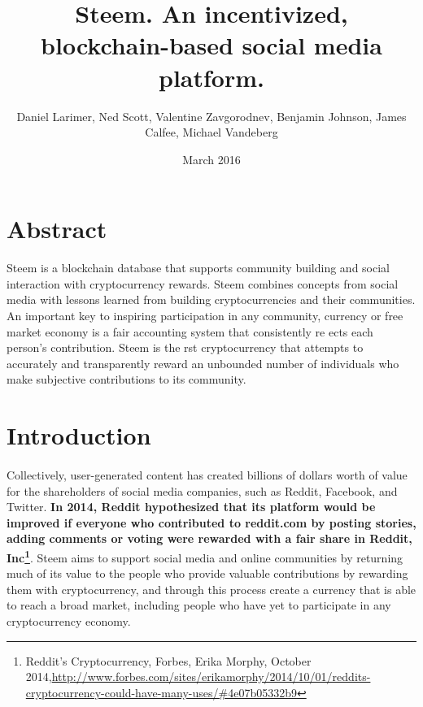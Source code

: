 \documentclass{article}
\title{Steem. An incentivized, blockchain-based social media platform.}
\date{March 2016}
\author{Daniel Larimer, Ned Scott, Valentine Zavgorodnev, Benjamin Johnson, James Calfee, Michael Vandeberg}
\begin{document}
  \renewcommand \thesection{\roman{section}}

  \maketitle

  \newpage

  \section{Abstract}

  Steem is a blockchain database that supports community building and social interaction with cryptocurrency rewards. Steem combines concepts from social media with lessons learned from building cryptocurrencies and their communities. An important key to inspiring participation in any community, currency or free market economy is a fair accounting system that consistently re ects each person's contribution. Steem is the  rst cryptocurrency that attempts to accurately and transparently reward an unbounded number of individuals who make subjective contributions to its community.

  \newpage

  \tableofcontents

  \newpage

  \setcounter{section}{0}

  \renewcommand \thesection{\arabic{section}}

    \section{Introduction}

        \paragraph{}
            Collectively, user-generated content has created billions of dollars worth of value for the shareholders of social media companies, such as Reddit, Facebook, and Twitter. \textbf{In 2014, Reddit hypothesized that its platform would be improved if everyone who contributed to reddit.com by posting stories, adding comments or voting were rewarded with a fair share in Reddit, Inc\footnote{Reddit's Cryptocurrency, Forbes, Erika Morphy, October 2014,\newline\url{http://www.forbes.com/sites/erikamorphy/2014/10/01/reddits-cryptocurrency-could-have-many-uses/\#4e07b05332b9}}}. Steem aims to support social media and online communities by returning much of its value to the people who provide valuable contributions by rewarding them with cryptocurrency, and through this process create a currency that is able to reach a broad market, including people who have yet to participate in any cryptocurrency economy.
\end{document}
